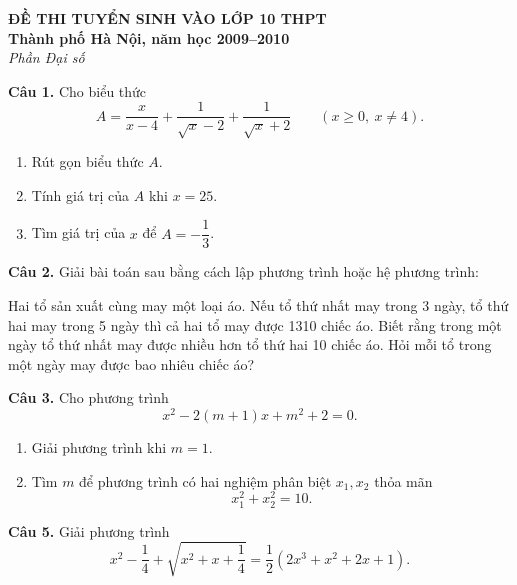 \documentclass[12pt,a4paper]{article}
\begin{document}
\begin{center}
{\Large\bfseries ĐỀ THI TUYỂN SINH VÀO LỚP 10 THPT}\\
{\bfseries Thành phố Hà Nội, năm học 2009--2010}\\
{\itshape Phần Đại số}
\end{center}

\textbf{Câu 1.} Cho biểu thức
\[
A=\frac{x}{x-4}+\frac{1}{\sqrt{x}-2}+\frac{1}{\sqrt{x}+2}
\qquad (x\ge0,\ x\ne4).
\]
\begin{enumerate}[label=\alph*)]
\item Rút gọn biểu thức $A$.
\item Tính giá trị của $A$ khi $x=25$.
\item Tìm giá trị của $x$ để $A=-\dfrac13$.
\end{enumerate}

\textbf{Câu 2.} Giải bài toán sau bằng cách lập phương trình hoặc hệ phương trình:

Hai tổ sản xuất cùng may một loại áo. Nếu tổ thứ nhất may trong 3 ngày, tổ thứ hai may trong 5 ngày thì cả hai tổ may được 1310 chiếc áo. Biết rằng trong một ngày tổ thứ nhất may được nhiều hơn tổ thứ hai 10 chiếc áo. Hỏi mỗi tổ trong một ngày may được bao nhiêu chiếc áo?

\textbf{Câu 3.} Cho phương trình
\[
x^2-2(m+1)x+m^2+2=0. \tag{1}
\]
\begin{enumerate}[label=\alph*)]
\item Giải phương trình khi $m=1$.
\item Tìm $m$ để phương trình có hai nghiệm phân biệt $x_1,x_2$ thỏa mãn
\[
x_1^2+x_2^2=10.
\]
\end{enumerate}

\textbf{Câu 5.} Giải phương trình
\[
x^2-\frac14+\sqrt{x^2+x+\frac14}
=\frac12\left(2x^3+x^2+2x+1\right).
\]
\end{document}

